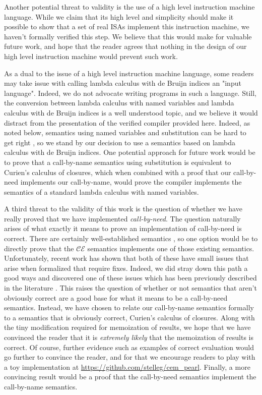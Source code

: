 Another potential threat to validity is the use of a high level instruction
machine language. While we claim that its high level and simplicity should make
it possible to show that a set of real ISAs implement this instruction machine,
we haven't formally verified this step. We believe that this would make
for valuable future work, and hope that the reader agrees that nothing in the
design of our high level instruction machine would prevent such work.

As a dual to the issue of a high level instruction machine language, some
readers may take issue with calling lambda calculus with de Bruijn indices an
"input language". Indeed, we do not advocate writing programs in such a
language. Still, the conversion between lambda calculus with named variables and
lambda calculus with de Bruijn indices is a well understood topic, and we
believe it would distract from the presentation of the verified compiler
provided here. Indeed, as noted below, semantics using named variables and
substitution can be hard to get right \cite{breitnerthesis, nakata2009small}, so
we stand by our decision to use a semantics based on lambda calculus with de
Bruijn indices. One potential approach for future work would be to prove that a
call-by-name semantics using substitution is equivalent to Curien's calculus of
closures, which when combined with a proof that our call-by-need implements our
call-by-name, would prove the compiler implements the semantics of a standard
lambda calculus with named variables.

A third threat to the validity of this work is the question of whether 
we have really proved that we have implemented \emph{call-by-need}. The question
naturally arises of what exactly it means to prove an implementation of
call-by-need is correct. There are certainly well-established semantics
\cite{launchburynatural, ariola1995call}, so one option would be to directly
prove that the $\mathcal{CE}$ semantics implements one of those existing
semantics.  Unfortunately, recent work has shown that both of these have small
issues that arise when formalized that require fixes. Indeed, we did stray down
this path a good ways and discovered one of these issues which has been
previously described in the literature \cite{nakata2009small}. This raises the
question of whether or not semantics that aren't obviously correct are a good
base for what it means to be a call-by-need semantics. Instead, we have chosen to
relate our call-by-name semantics formally to a semantics that is obviously
correct, Curien's calculus of closures. Along with the tiny modification
required for memoization of results, we hope that we have convinced the reader
that it is \emph{extremely likely} that the memoization of results is correct.
Of course, further evidence such as examples of correct evaluation would go
further to convince the reader, and for that we encourage readers to
play with a toy implementation at \url{https://github.com/stelleg/cem_pearl}.
Finally, a more convincing result would be a proof that the call-by-need
semantics implement the call-by-name semantics. 

